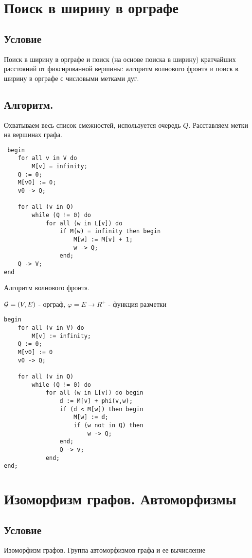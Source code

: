 \documentclass{report}
\begin{document}
\newpage

\section{Поиск в ширину в орграфе}
\subsection{Условие}
Поиск в ширину в орграфе и поиск (на основе поиска в ширину) кратчайших расстояний
от фиксированной вершины: алгоритм волнового фронта и поиск в ширину в орграфе
с числовыми метками дуг.

\subsection{Алгоритм.}
Охватываем весь список смежностей, используется очередь $Q$. Расставляем метки
на вершинах графа.

 \begin{lstlisting}
 begin
 	for all v in V do
		M[v] = infinity;
	Q := 0;
	M[v0] := 0;
	v0 -> Q;

	for all (v in Q)
		while (Q != 0) do
			for all (w in L[v]) do
				if M(w) = infinity then begin
					M[w] := M[v] + 1;
					w -> Q;
				end;
	Q -> V;
end
\end{lstlisting}

Алгоритм волнового фронта.

$ {\cal G} = (V, E)$ - орграф, $\varphi = E \to R^{+}$ - функция разметки

\begin{lstlisting}
begin
	for all (v in V) do
		M[v] := infinity;
	Q := 0;
	M[v0] := 0
	v0 -> Q;

	for all (v in Q)
		while (Q != 0) do
			for all (w in L[v]) do begin
				d := M[v] + phi(v,w);
				if (d < M[w]) then begin
					M[w] := d;
					if (w not in Q) then
						w -> Q;
				end;
				Q -> v;
			end;
end;	
\end{lstlisting}

\newpage

\section{Изоморфизм графов. Автоморфизмы}
\subsection{Условие}
Изоморфизм графов. Группа автоморфизмов графа и ее вычисление
\end{document}
